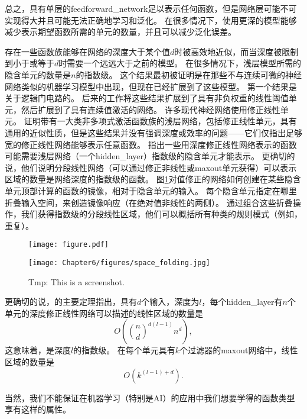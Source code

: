 总之，具有单层的\gls{feedforward_network}足以表示任何函数，但是网络层可能不可实现得大并且可能无法正确地学习和泛化。
在很多情况下，使用更深的模型能够减少表示期望函数所需的单元的数量，并且可以减少泛化误差。


存在一些函数族能够在网络的深度大于某个值$d$时被高效地近似，而当深度被限制到小于或等于$d$时需要一个远远大于之前的模型。
在很多情况下，浅层模型所需的隐含单元的数量是$n$的指数级。
这个结果最初被证明是在那些不与连续可微的神经网络类似的机器学习模型中出现，但现在已经扩展到了这些模型。
第一个结果是关于逻辑门电路的\citep{Hastad86}。
后来的工作将这些结果扩展到了具有非负权重的线性阈值单元\citep{Hastad91,Hajnal-et-al-1993}，然后扩展到了具有连续值激活的网络\citep{Maass-1992,Maass-et-al-1994}。
许多现代神经网络使用修正线性单元。
\cite{Leshno-et-al-1993}证明带有一大类非多项式激活函数族的浅层网络，包括修正线性单元，具有通用的近似性质，但是这些结果并没有强调深度或效率的问题——它们仅指出足够宽的修正线性网络能够表示任意函数。
\cite{Montufar-et-al-NIPS2014}指出一些用深度修正线性网络表示的函数可能需要浅层网络（一个\gls{hidden_layer}）指数级的隐含单元才能表示。
更确切的说，他们说明分段线性网络（可以通过修正非线性或maxout单元获得）可以表示区域的数量是网络深度的指数级的函数。
图\ref{fig:chap6_space_folding}对值修正的网络如何创建在某些隐含单元顶部计算的函数的镜像，相对于隐含单元的输入。
每个隐含单元指定在哪里折叠输入空间，来创造镜像响应（在绝对值非线性的两侧）。
通过组合这些折叠操作，我们获得指数级的分段线性区域，他们可以概括所有种类的规则模式（例如，重复）。
\begin{figure}[!htb]
\ifOpenSource
\centerline{\texttt{[image: figure.pdf]}}
\else
\centerline{\texttt{[image: Chapter6/figures/space\_folding.jpg]}}
\fi
\caption{Tmp: This is a screenshot.}
\label{fig:chap6_space_folding}
\end{figure}


更确切的说，\cite{Montufar-et-al-NIPS2014}的主要定理指出，具有$d$个输入，深度为$l$，每个\gls{hidden_layer}有$n$个单元的深度修正线性网络可以描述的线性区域的数量是
\begin{equation}
O \left ( {n \choose d}^{d(l-1)} n^d \right ),
\end{equation}
这意味着，是深度$l$的指数级。
在每个单元具有$k$个过滤器的maxout网络中，线性区域的数量是
\begin{equation}
O \left ( k^{(l-1)+d} \right ).
\end{equation}


当然，我们不能保证在机器学习（特别是AI）的应用中我们想要学得的函数类型享有这样的属性。

